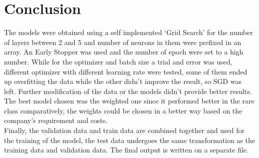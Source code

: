 \documentclass[12pt, twocolumn]{article}
\begin{document}
\section*{Conclusion}
The models were obtained using a self implemented `Grid Search' for the number of layers between 2 and 5 and number of neurons in them were prefixed in an array.
An Early Stopper was used and the number of epoch were set to a high number.
While for the optimizer and batch size a trial and error was used, different optimizer with different learning rate were tested, some of them ended up overfitting the data while the other didn't improve the result, so SGD was left.
Further modification of the data or the models didn't provide better results.\\
The best model chosen was the weighted one since it performed better in the rare class comparatively, the weights could be chosen in a better way based on the company's requirement and costs. \\
Finally, the validation data and train data are combined together and used for the training of the model, the test data undergoes the same transformation as the training data and validation data. The final output is written on a separate file.\\
\end{document}
